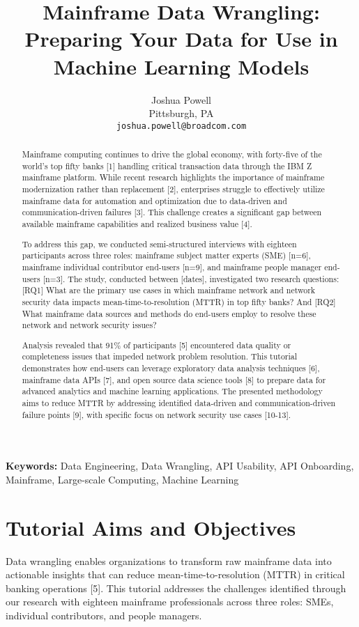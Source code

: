 \documentclass[a4paper]{article}
\title{Mainframe Data Wrangling: Preparing Your Data for Use in Machine Learning Models }
\author{Joshua Powell \\
  Pittsburgh, PA \\
  {\tt joshua.powell@broadcom.com} \\}
\begin{document}
\maketitle

\begin{abstract}
    Mainframe computing continues to drive the global economy, with forty-five of the world's top fifty banks [1] handling critical transaction data through the IBM Z mainframe platform. While recent research highlights the importance of mainframe modernization rather than replacement [2], enterprises struggle to effectively utilize mainframe data for automation and optimization due to data-driven and communication-driven failures [3]. This challenge creates a significant gap between available mainframe capabilities and realized business value [4].

    To address this gap, we conducted semi-structured interviews with eighteen participants across three roles: mainframe subject   matter experts (SME) [n=6], mainframe individual contributor end-users [n=9], and mainframe people manager end-users [n=3]. The study, conducted between [dates], investigated two research questions: [RQ1] What are the primary use cases in which mainframe network and network security data impacts mean-time-to-resolution (MTTR) in top fifty banks? And [RQ2] What mainframe data sources and methods do end-users employ to resolve these network and network security issues?
    
    Analysis revealed that 91\% of participants [5] encountered data quality or completeness issues that impeded network problem resolution. This tutorial demonstrates how end-users can leverage exploratory data analysis techniques [6], mainframe data APIs [7], and open source data science tools [8] to prepare data for advanced analytics and machine learning applications. The presented methodology aims to reduce MTTR by addressing identified data-driven and communication-driven failure points [9], with specific focus on network security use cases [10-13].
\end{abstract}

\textbf{Keywords: }Data Engineering, Data Wrangling, API Usability, API Onboarding, Mainframe, Large-scale Computing, Machine Learning

\section{Tutorial Aims and Objectives}
    Data wrangling enables organizations to transform raw mainframe data into actionable insights that can reduce mean-time-to-resolution (MTTR) in critical banking operations [5]. This tutorial addresses the challenges identified through our research with eighteen mainframe professionals across three roles: SMEs, individual contributors, and people managers.
\end{document}
